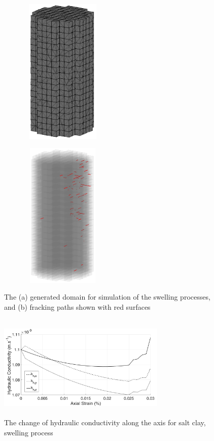 \begin{figure}[!ht]
\begin{subfigure}[c]{0.5\textwidth}
\centering
\includegraphics[width=4cm,height=7cm]{figures/Amir_ME5_Lattice_Setup.png}
\subcaption{}
\label{fig:Amir_ME5_Lattice_Setup}
\end{subfigure}
\begin{subfigure}[c]{0.5\textwidth}
\centering
\includegraphics[width=4cm,height=7cm]{figures/Amir_ME5_Lattice_Frack.png}
\subcaption{}
\label{fig:Amir_ME5_Lattice_Frack}
\end{subfigure}
\caption{The (a) generated domain for simulation of the swelling processes, and (b) fracking paths shown with red surfaces}
\end{figure}

\begin{figure}[!ht]
\centering
\includegraphics[width=8cm,height=5cm]{figures/Amir_ME5_Lattice_Drying.png}
\caption{The change of hydraulic conductivity along the axis for salt clay, swelling process}
\label{fig:Amir_ME5_Lattice_Drying}
\end{figure} 


